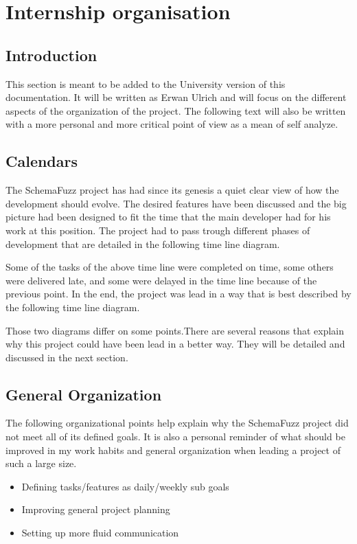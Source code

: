 
\section{Internship organisation} 
	\subsection{Introduction}

This section is meant to be added to the University version of this documentation. It will be written as Erwan Ulrich and will focus on the different aspects of the organization of the project. The following text will also be written with a more personal and more critical point of view as a mean of self analyze.

	\subsection{Calendars}
	
The	SchemaFuzz project has had since its genesis a quiet clear view of how the development should evolve. The desired features have been discussed and the big picture had been designed to fit the time that the main developer had for his work at this position.
The project had to pass trough different phases of development that are detailed in the following time line diagram. %

Some of the tasks of the above time line were completed on time, some others were delivered late, and some were delayed in the time line because of the previous point.
In the end, the project was lead in a way that is best described by the following time line diagram. %

Those two diagrams differ on some points.There are several reasons that explain why this project could have been lead in a better way. They will be detailed and discussed in the next section. 

	\subsection{General Organization}
The following organizational points help explain why the SchemaFuzz project did not meet all of its defined goals.
It is also a personal reminder of what should be improved in my work habits and general organization when leading a project of such a large size. 
	
	\begin{itemize}
	\item{Defining tasks/features as daily/weekly sub goals}
	\item{Improving general project planning} %
	\item{Setting up more fluid communication}
	\end{itemize}		

